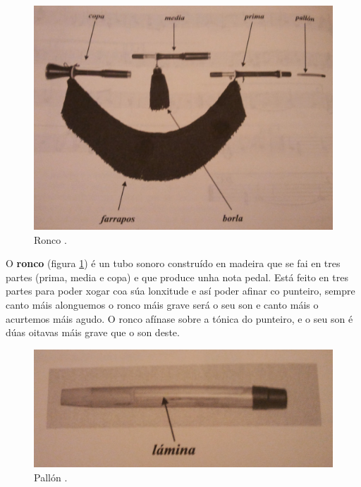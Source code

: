  \begin{figure}[htbp]
  \centering
  \includegraphics[scale=0.1,keepaspectratio=true]{./imagenes/bruno-villamor-ronco.jpg}
  \caption[Ronco]{Ronco \cite{BrunoVillamorCaderno15}.}
  \label{figura:BrunoVillamorRonco}
 \end{figure}

 O \textbf{ronco} (figura \ref{figura:BrunoVillamorRonco}) é un tubo sonoro
 construído en madeira que se fai en tres partes (prima, media e copa) e que
 produce unha nota pedal. Está feito en tres partes para poder xogar coa súa
 lonxitude e así poder afinar co punteiro, sempre canto máis alonguemos o ronco
 máis grave será o seu son e canto máis o acurtemos máis agudo. O ronco afínase
 sobre a tónica do punteiro, e o seu son é dúas oitavas máis grave que o son
 deste. \\

 \begin{figure}[htbp]
  \centering
  \includegraphics[scale=0.1,keepaspectratio=true]{./imagenes/bruno-villamor-pallon.jpg}
  \caption[Pallón]{Pallón \cite{BrunoVillamorCaderno15}.}
  \label{figura:BrunoVillamorPallon}
 \end{figure}


